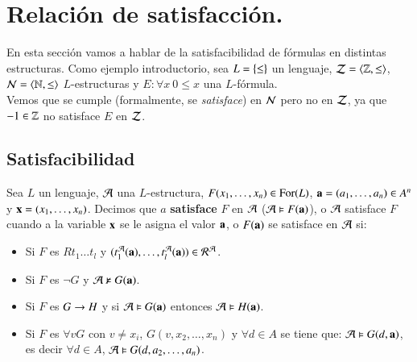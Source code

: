 \chapter{Relación de satisfacción.}

En esta sección vamos a hablar de la satisfacibilidad de fórmulas en distintas estructuras. Como ejemplo introductorio, sea $L = \left\{\leq\right\}$ un lenguaje, $\mathcal{Z} = \langle\mathbb{Z}, \leq\rangle$, $\mathcal{N} = \langle\mathbb{N}, \leq\rangle$ $L$-estructuras y $E: \forall x\ 0 \leq x$ una $L$-fórmula.\\
Vemos que se cumple (formalmente, se \textit{satisface}) en $\mathcal{N}$ pero no en $\mathcal{Z}$, ya que $-1 \in \mathbb{Z}$ no satisface $E$ en $\mathcal{Z}$.

\section{Satisfacibilidad}

\begin{dfn}
    Sea $L$ un lenguaje, $\mathcal{A}$ una $L$-estructura, $F(x_1, \ldots, x_n) \in \mathrm{For}(L)$, $\mathbf{a} = (a_1, \ldots, a_n) \in A^n$ y $\mathbf{x} = (x_1, \ldots, x_n)$. Decimos que $a$ \textbf{satisface} $F$ en $\mathcal{A}$ ($\mathcal{A} \vDash F(\mathbf{a})$), o $\mathcal{A}$ satisface $F$ cuando a la variable $\mathbf{x}$ se le asigna el valor $\mathbf{a}$, o $F(\mathbf{a})$ se satisface en $\mathcal{A}$ si:

    \begin{itemize}
        \item Si $F$ es $R t_1 \ldots t_l$ y $(t_1^{\mathcal{A}}(\mathbf{a}), \ldots, t_l^{\mathcal{A}}(\mathbf{a})) \in \mathcal{R}^{\mathcal{A}}$.
        \item Si $F$ es $\neg G$ y $\mathcal{A} \nvDash G(\mathbf{a})$.
        \item Si $F$ es $G \rightarrow H$ y si $\mathcal{A} \vDash G(\mathbf{a})$ entonces $\mathcal{A} \vDash H(\mathbf{a})$.
        \item Si $F$ es $\forall v G$ con $v \neq x_i$, $G(v, x_2, \ldots, x_n)$ y $\forall d \in A$ se tiene que: $\mathcal{A} \vDash G(d, \mathbf{a})$, es decir $\forall d \in A$, $\mathcal{A} \vDash G(d, a_2, \ldots, a_n)$.
    \end{itemize}
\end{dfn}

